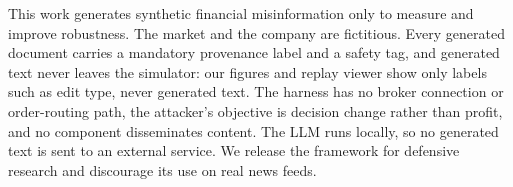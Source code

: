 This work generates synthetic financial misinformation only to measure and improve robustness. The market and the company are fictitious. Every generated document carries a mandatory provenance label and a safety tag, and generated text never leaves the simulator: our figures and replay viewer show only labels such as edit type, never generated text. The harness has no broker connection or order-routing path, the attacker's objective is decision change rather than profit, and no component disseminates content. The LLM runs locally, so no generated text is sent to an external service. We release the framework for defensive research and discourage its use on real news feeds.
